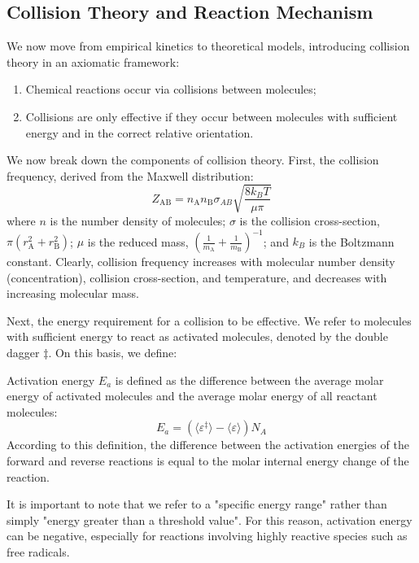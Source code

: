 \subsection{Collision Theory and Reaction Mechanism}

We now move from empirical kinetics to theoretical models, introducing collision theory in an axiomatic framework:

\begin{definition}
\begin{enumerate}
  \item Chemical reactions occur via collisions between molecules;
  \item Collisions are only effective if they occur between molecules with sufficient energy and in the correct relative orientation.
\end{enumerate}
\end{definition}

We now break down the components of collision theory. First, the collision frequency, derived from the Maxwell distribution:
$$Z_{\text{AB}} = n_{\text{A}} n_{\text{B}} \sigma_{AB}\sqrt{\frac{8 k_B T}{\mu \pi} }$$
where $n$ is the number density of molecules; $\sigma$ is the collision cross-section, $\pi(r_{\text{A}}^2+r_{\text{B}}^2)$; $\mu$ is the reduced mass, $\left(\frac{1}{m_{\text{A}}}+\frac{1}{m_{\text{B}}}\right)^{-1}$; and $k_B$ is the Boltzmann constant. Clearly, collision frequency increases with molecular number density (concentration), collision cross-section, and temperature, and decreases with increasing molecular mass.

Next, the energy requirement for a collision to be effective. We refer to molecules with sufficient energy to react as activated molecules, denoted by the double dagger $\ddagger$. On this basis, we define:

\begin{definition}
Activation energy $E_a$ is defined as the difference between the average molar energy of activated molecules and the average molar energy of all reactant molecules:
$$ E_a = \left(\langle \varepsilon ^\ddagger \rangle - \langle \varepsilon  \rangle\right)N_A$$
According to this definition, the difference between the activation energies of the forward and reverse reactions is equal to the molar internal energy change of the reaction.
\end{definition}

It is important to note that we refer to a "specific energy range" rather than simply "energy greater than a threshold value". For this reason, activation energy can be negative, especially for reactions involving highly reactive species such as free radicals.

